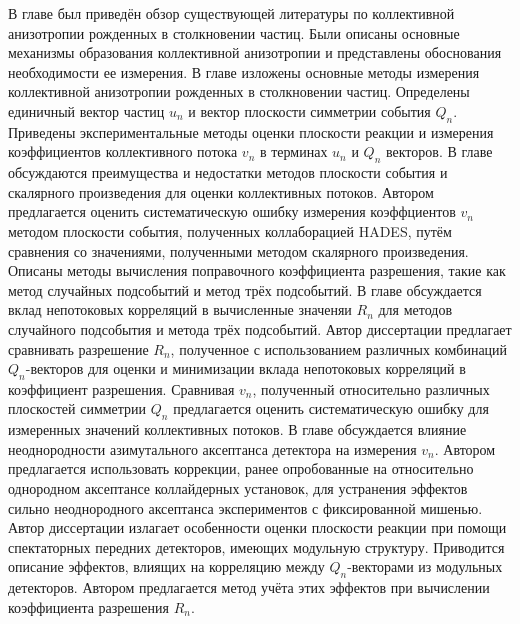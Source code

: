 В главе был приведён обзор существующей литературы по коллективной анизотропии рожденных в столкновении частиц. 
Были описаны основные механизмы образования коллективной анизотропии и представлены обоснования необходимости ее измерения.
В главе изложены основные методы измерения коллективной анизотропии рожденных в столкновении частиц.
Определены единичный вектор частиц $u_n$ и вектор плоскости симметрии события $Q_n$.
Приведены экспериментальные методы оценки плоскости реакции и измерения коэффициентов коллективного потока $v_n$ в терминах $u_n$ и $Q_n$ векторов.
В главе обсуждаются преимущества и недостатки методов плоскости события и скалярного произведения для оценки коллективных потоков. 
Автором предлагается оценить систематическую ошибку измерения коэффциентов $v_n$ методом плоскости события, полученных коллаборацией HADES, путём сравнения со значениями, полученными методом скалярного произведения.
Описаны методы вычисления поправочного коэффициента разрешения, такие как метод случайных подсобытий и метод трёх подсобытий.
В главе обсуждается вклад непотоковых корреляций в вычисленные значеняи $R_n$ для методов случайного подсобытия и метода трёх подсобытий.
Автор диссертации предлагает сравнивать разрешение $R_n$, полученное с использованием различных комбинаций $Q_n$-векторов для оценки и минимизации вклада непотоковых корреляций в коэффициент разрешения. 
Сравнивая $v_n$, полученный относительно различных плоскостей симметрии $Q_n$ предлагается оценить систематическую ошибку для измеренных значений коллективных потоков. 
В главе обсуждается влияние неоднородности азимутального аксептанса детектора на измерения $v_n$.
Автором предлагается использовать коррекции, ранее опробованные на относительно однородном аксептансе коллайдерных установок, для устранения эффектов сильно неоднородного аксептанса экспериментов с фиксированной мишенью. 
Автор диссертации излагает особенности оценки плоскости реакции при помощи спектаторных передних детекторов, имеющих модульную структуру.
Приводится описание эффектов, влиящих на корреляцию между $Q_n$-векторами из модульных детекторов. 
Автором предлагается метод учёта этих эффектов при вычислении коэффициента разрешения $R_n$.